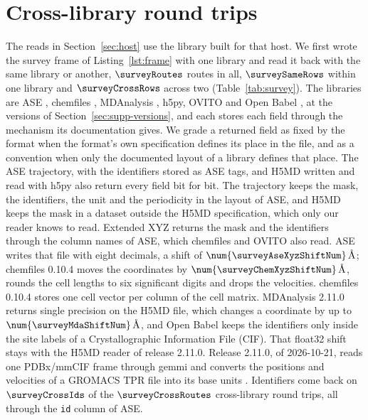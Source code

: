 \section{Cross-library round trips}\label{sec:supp-rounds}
The reads in Section~\ref{sec:host} use the library built for that host.
We first wrote the survey frame of Listing~\ref{lst:frame} with one library and read it back with the same library or another, \(\surveyRoutes\) routes in all, \(\surveySameRows\) within one library and \(\surveyCrossRows\) across two (Table~\ref{tab:survey}).
The libraries are ASE \cite{larsenAtomicSimulationEnvironmenta2017}, chemfiles \cite{frauxChemfileschemfilesVersion01042023}, MDAnalysis \cite{gowersMdanalysisPythonPackage2016,gowersMdanalysis21102026}, h5py, OVITO \cite{stukowskiVisualizationAnalysisAtomistic2010} and Open Babel \cite{oboyleOpenBabelOpen2011}, at the versions of Section~\ref{sec:supp-versions}, and each stores each field through the mechanism its documentation gives.
We grade a returned field as fixed by the format when the format's own specification defines its place in the file, and as a convention when only the documented layout of a library defines that place.
The ASE trajectory, with the identifiers stored as ASE tags, and H5MD written and read with h5py also return every field bit for bit.
The trajectory keeps the mask, the identifiers, the unit and the periodicity in the layout of ASE, and H5MD keeps the mask in a dataset outside the H5MD specification, which only our reader knows to read.
Extended XYZ returns the mask and the identifiers through the column names of ASE, which chemfiles and OVITO also read.
ASE writes that file with eight decimals, a shift of \(\num{\surveyAseXyzShiftNum}\,\text{\AA}\); chemfiles 0.10.4 moves the coordinates by \(\num{\surveyChemXyzShiftNum}\,\text{\AA}\), rounds the cell lengths to six significant digits and drops the velocities.
chemfiles 0.10.4 stores one cell vector per column of the cell matrix.
MDAnalysis 2.11.0 returns single precision on the H5MD file, which changes a coordinate by up to \(\num{\surveyMdaShiftNum}\,\text{\AA}\), and Open Babel keeps the identifiers only inside the site labels of a Crystallographic Information File (CIF).
That float32 shift stays with the H5MD reader of release 2.11.0.
Release 2.11.0, of 2026-10-21, reads one PDBx/mmCIF frame through gemmi and converts the positions and velocities of a GROMACS TPR file into its base units \cite{gowersMdanalysis21102026}.
Identifiers come back on \(\surveyCrossIds\) of the \(\surveyCrossRoutes\) cross-library round trips, all through the \texttt{id} column of ASE.

